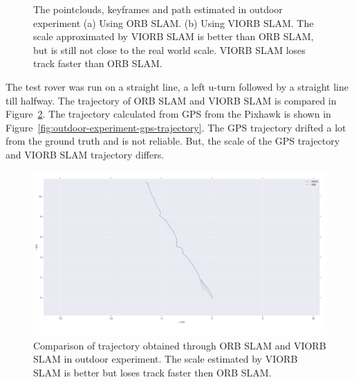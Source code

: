 \begin{figure}[h]
	
	\centering
	\caption[Outdoor experiment.]{\small 
		The pointclouds, keyframes and path estimated in outdoor experiment (a) Using ORB SLAM. (b) Using VIORB SLAM. The scale approximated by VIORB SLAM is better than ORB SLAM, but is still not close to the real world scale. VIORB SLAM loses track faster than ORB SLAM. }
	\label{fig:outdoor-path-visualization}
	
\end{figure}

The test rover was run on a straight line, a left u-turn followed by a straight line till halfway.
The trajectory of ORB SLAM and VIORB SLAM is compared in Figure~\ref{fig:outdoor-experiment-trajectory}. The trajectory calculated from GPS from the Pixhawk is shown in  Figure~\ref{fig:outdoor-experiment-gps-trajectory}. The GPS trajectory drifted a lot from the ground truth and is not reliable. But, the scale of the GPS trajectory and VIORB SLAM trajectory differs.

\begin{figure}[h]
	\centering
	\includegraphics[width=5.5in]{figures/demo3_trajectory}
	\caption[Outdoor experiment trajectory]{\small 
		Comparison of trajectory obtained through ORB SLAM and VIORB SLAM in outdoor experiment. The scale estimated by VIORB SLAM is better but loses track faster then ORB SLAM. }
	\label{fig:outdoor-experiment-trajectory}
\end{figure}

